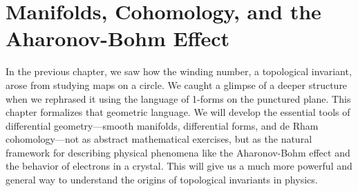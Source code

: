 \chapter{Manifolds, Cohomology, and the Aharonov-Bohm Effect}
\label{chap:chapter02}

In the previous chapter, we saw how the winding number, a topological invariant, arose from studying maps on a circle. We caught a glimpse of a deeper structure when we rephrased it using the language of 1-forms on the punctured plane. This chapter formalizes that geometric language. We will develop the essential tools of differential geometry—smooth manifolds, differential forms, and de Rham cohomology—not as abstract mathematical exercises, but as the natural framework for describing physical phenomena like the Aharonov-Bohm effect and the behavior of electrons in a crystal. This will give us a much more powerful and general way to understand the origins of topological invariants in physics.





